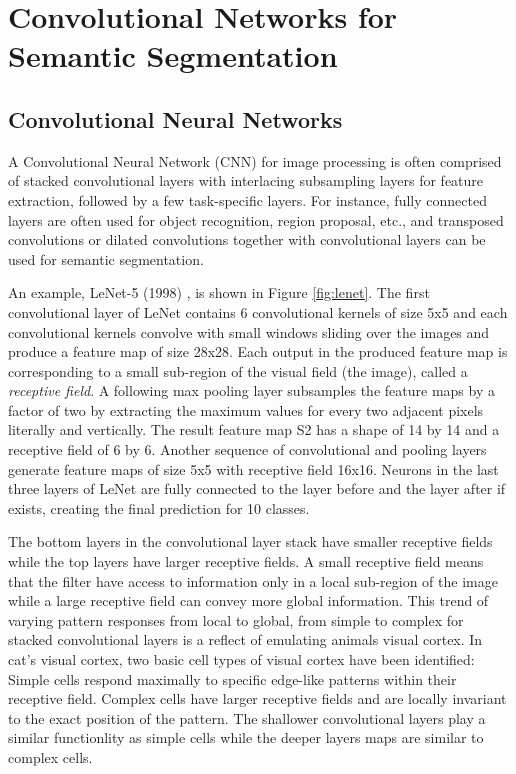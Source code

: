 \appendix



\section{Convolutional Networks for Semantic Segmentation}
\subsection{Convolutional Neural Networks}

A Convolutional Neural Network (CNN) for image processing is often comprised of stacked convolutional layers with interlacing subsampling layers for feature extraction, followed by a few task-specific layers.%
For instance, fully connected layers are often used for object recognition\cite{lecun1998gradient,krizhevsky2012imagenet}, region proposal\cite{ren2015faster}, etc., and transposed convolutions or dilated convolutions together with convolutional layers can be used for semantic segmentation\cite{long2015fully,yu2015multi}.

An example, LeNet-5 (1998) \cite{lecun1998gradient}, is shown in Figure \ref{fig:lenet}.
The first convolutional layer of LeNet contains 6 convolutional kernels of size 5x5 and each convolutional kernels convolve with small windows sliding over the images and produce a feature map of size 28x28.
Each output in the produced feature map is corresponding to a small sub-region of the visual field (the image), called a \textit{receptive field}.
A following max pooling layer subsamples the feature maps by a factor of two by extracting the maximum values for every two adjacent pixels literally and vertically.
The result feature map S2 has a shape of 14 by 14 and a receptive field of 6 by 6.
Another sequence of convolutional and pooling layers generate feature maps of size 5x5 with receptive field 16x16.
Neurons in the last three layers of LeNet are fully connected to the layer before and the layer after if exists, creating the final prediction for 10 classes.

The bottom layers in the convolutional layer stack have smaller receptive fields while the top layers have larger receptive fields.
A small receptive field means that the filter have access to information only in a local sub-region of the image while a large receptive field can convey more global information.
This trend of varying pattern responses from local to global, from simple to complex for stacked convolutional layers is a reflect of emulating animals visual cortex.
In cat's visual cortex\cite{hubel1962receptive}, two basic cell types of visual cortex have been identified:
Simple cells respond maximally to specific edge-like patterns within their receptive field.
Complex cells have larger receptive fields and are locally invariant to the exact position of the pattern.
The shallower convolutional layers play a similar functionlity as simple cells while the deeper layers maps are similar to complex cells.

